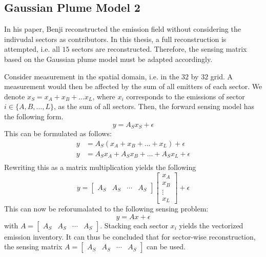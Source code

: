 \subsection{Gaussian Plume Model 2}

In his paper, Benji reconstructed the emission field without considering the indivudal sectors as contributors.
In this thesis, a full reconstruction is attempted, i.e. all $15$ sectors are reconstructed.
Therefore, the sensing matrix based on the Gaussian plume model must be adapted accordingly.

Consider measurement in the spatial domain, i.e. in the $32$ by $32$ grid.
A measurement would then be affected by the sum of all emitters of each sector.
We denote $x_S = x_A + x_B + \dots x_L$, where $x_i$ corresponds to the emissions of sector $i \in \{A, B, \dots, L\}$, as the sum of all sectors.
Then, the forward sensing model has the following form.
\begin{equation}
    y = A_S x_S + \epsilon
\end{equation}
This can be formulated as follows:
\begin{align}
    y &= A_S (x_A + x_B + \dots + x_L) + \epsilon \\
    y &= A_S x_A + A_S x_B + \dots + A_S x_L + \epsilon \\
\end{align}
Rewriting this as a matrix multiplication yields the following
\begin{equation}
    y = \begin{bmatrix} A_S & A_S & \cdots & A_S \end{bmatrix}\begin{bmatrix} x_A \\ x_B \\ \vdots \\x_L \end{bmatrix} + \epsilon
\end{equation}
This can now be reforumalated to the following sensing problem:
\begin{equation}
    y = Ax + \epsilon
\end{equation}
with $A = \begin{bmatrix} A_S & A_S & \cdots & A_S \end{bmatrix}$.
Stacking each sector $x_i$ yields the vectorized emission inventory.
It can thus be concluded that for sector-wise reconstruction, the sensing matrix $A = \begin{bmatrix} A_S & A_S & \cdots & A_S \end{bmatrix}$ can be used.

